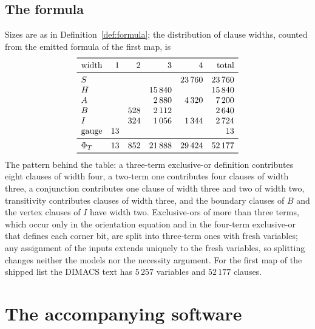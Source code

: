 \documentclass[11pt,reqno]{amsart}
\theoremstyle{plain}
\theoremstyle{definition}
\begin{document}
\subsection{The formula}
Sizes are as in Definition~\ref{def:formula}; the distribution of clause widths, counted from the
emitted formula of the first map, is
\[
\begin{array}{lrrrrr}
\toprule
\text{width} & 1 & 2 & 3 & 4 & \text{total}\\
\midrule
S      &   &     & & 23\,760 & 23\,760\\
H      &   &     & 15\,840 & & 15\,840\\
A      &   &     & 2\,880 & 4\,320 & 7\,200\\
B      &   & 528 & 2\,112 & & 2\,640\\
I      &   & 324 & 1\,056 & 1\,344 & 2\,724\\
\text{gauge} & 13 & & & & 13\\
\midrule
\Phi_T & 13 & 852 & 21\,888 & 29\,424 & 52\,177\\
\bottomrule
\end{array}
\]
The pattern behind the table: a three-term exclusive-or definition contributes eight clauses of width
four, a two-term one contributes four clauses of width three, a conjunction contributes one clause of
width three and two of width two, transitivity contributes clauses of width three, and the boundary
clauses of $B$ and the vertex clauses of $I$ have width two. Exclusive-ors of more than three terms,
which occur only in the orientation equation and in the four-term exclusive-or that defines each
corner bit, are split into three-term ones with fresh variables; any assignment of the inputs extends uniquely to the fresh variables, so
splitting changes neither the models nor the necessity argument. For the first map of the shipped list
the DIMACS text has $5\,257$ variables and $52\,177$ clauses.

\section{The accompanying software}\label{app:software}
\end{document}
